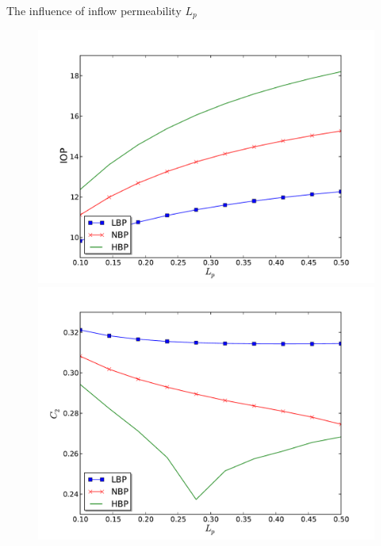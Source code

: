 \begin{frame}{The influence of inflow permeability $L_p$}
\begin{figure}[H]
\begin{minipage}{0.45\linewidth}
\includegraphics[scale=0.27]{images/IOP_Lp}
\end{minipage}\hfill
\begin{minipage}{0.45\linewidth}
\includegraphics[scale=0.27]{images/C2_Lp}
\end{minipage}
\end{figure}

\end{frame}

